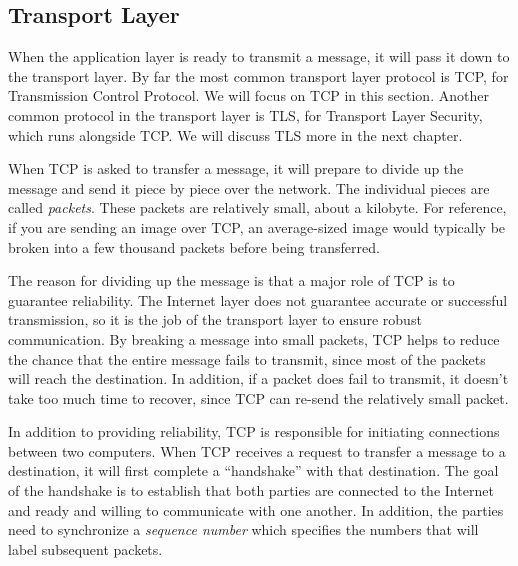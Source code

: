 
\subsection{Transport Layer}

When the application layer is ready to transmit a message, it will pass it down to the transport layer. By far the most common transport layer protocol is TCP, for Transmission Control Protocol. We will focus on TCP in this section. Another common protocol in the transport layer is TLS, for Transport Layer Security, which runs alongside TCP. We will discuss TLS more in the next chapter.

When TCP is asked to transfer a message, it will prepare to divide up the message and send it piece by piece over the network. The individual pieces are called \emph{packets}. These packets are relatively small, about a kilobyte. For reference, if you are sending an image over TCP, an average-sized image would typically be broken into a few thousand packets before being transferred. 

The reason for dividing up the message is that a major role of TCP is to guarantee reliability. 
The Internet layer does not guarantee accurate or successful transmission, so it is the job of the transport layer to ensure robust communication. By breaking a message into small packets, TCP helps to reduce the chance that the entire message fails to transmit, since most of the packets will reach the destination. In addition, if a packet does fail to transmit, it doesn't take too much time to recover, since TCP can re-send the relatively small packet.

In addition to providing reliability, TCP is responsible for initiating connections between two computers. When TCP receives a request to transfer a message to a destination, it will first complete a ``handshake'' with that destination. The goal of the handshake is to establish that both parties are connected to the Internet and ready and willing to communicate with one another. In addition, the parties need to synchronize a \emph{sequence number} which specifies the numbers that will label subsequent packets.

